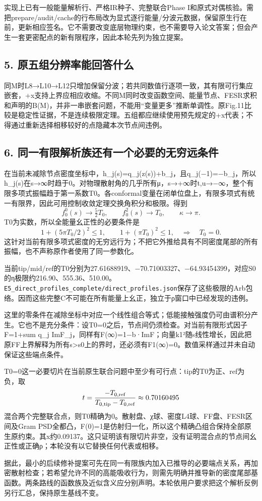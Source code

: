 \documentclass[
  11pt,
  a4paper,
]{article}
\begin{document}
实现上已有一般能量解析行、严格IR种子、完整联合Phase
I和原式对偶核验。需把prepare/audit/cache的行布局改为显式逐行能量/分波元数据，保留原生行在前，更新相应签名。它不需要改变底层物理约束，也不需要导入论文答案；但会产生一套更密配点的新有限程序，因此本轮先列为独立提案。

\subsection{5.
原五组分辨率能回答什么}\label{ux539fux4e94ux7ec4ux5206ux8fa8ux7387ux80fdux56deux7b54ux4ec0ux4e48}

同M时L8→L10→L12只增加保留分波；若共同数值行逐项一致，其有限可行集应嵌套，+x支持上界应相应收缩。不同M同时改变函数空间、能量节点、FESR求积和声明的B(M)，并非一串嵌套问题，不能用``变量更多''推断单调性。原Fig.11比较是稳定性证据，不是连续极限定理。五组都应继续使用预先规定的+x代表；不得通过重新选择相移较好的点隐藏本次节点间违例。

\subsection{6.
同一有限解析族还有一个必要的无穷远条件}\label{ux540cux4e00ux6709ux9650ux89e3ux6790ux65cfux8fd8ux6709ux4e00ux4e2aux5fc5ux8981ux7684ux65e0ux7a77ux8fdcux6761ux4ef6}

在当前未减除节点密度坐标中，h\_j(s)=q\_j(z(s))+b\_j，且q\_j(−1)=−b\_j，所以h\_j(s)在s→∞时趋于0。对物理散射角的几乎所有μ，s→+∞时t,u→−∞，整个有限多项式振幅趋于第一系数T0。各conformal变量在闭单位盘上，有限多项式有统一有限界，因此可用控制收敛定理交换角积分和极限。得到
\[
f_0^0(s)\longrightarrow\tfrac52T_0,
\qquad f_0^2(s)\longrightarrow T_0,
\qquad \kappa\longrightarrow\pi.
\] T0为实数，所以全能量幺正性的必要条件是 \[
1+(5\pi T_0/2)^2\le1,\qquad 1+(\pi T_0)^2\le1,
\quad\Longrightarrow\quad T_0=0.
\]
这针对当前有限多项式密度的无穷远行为；不把它外推给具有不同密度尾部的所有振幅，也不声称原作者使用了同一参数化。

当前tip/mid/ref的T0分别为27.61688919、−70.71003327、−64.93454399，对应S0的η极限约216.90、555.36、510.00。\texttt{E5\_direct\_profiles\_complete/direct\_profiles.json}保存了这些极限的Arb包络。因而这些完整C不可能在所有能量上幺正，独立于ρ窗口中已经发现的违例。

这里的零条件在减除坐标中对应一个线性组合等式；低能接触强度仍可由谱积分产生。它也不是充分条件：设T0=0之后，节点间仍须检查。对当前有限形式因子F=1+sum
q\_j
ImF\_j，同样有F(∞)=1−b·ImF；向量k1²随s线性增长，因此把原FF上界解释为所有s\textgreater s0上的界时，还必须有F1(∞)=0。数值采样通过并未自动保证这些端点条件。

T0=0这一必要切片在当前原生联合问题中至少有可行点：tip的T0为正、ref为负，取
\[
t={-T_{0,\mathrm{ref}}\over T_{0,\mathrm{tip}}-T_{0,\mathrm{ref}}}\approx0.70160495
\]
混合两个完整联合点，则T0精确为0。散射盘、χ球、密度L4球、FF盘、FESR区间及Gram
PSD全都凸，F(0)=1是仿射归一化，所以这个精确凸组合保持全部原生原约束。其x约0.09137。这只证明该有限切片非空，没有证明混合点的节点间幺正性或正确ρ；本轮没有以它替换任何代表或相移。

据此，最小的后续修补提案可先在同一有限族内加入已推导的必要端点关系，再加密散射检查；若希望允许不同的高能吸收行为，则需先明确并推导新的密度尾部基函数。两条路线的函数族及近似含义应分别声明。本轮依用户要求把这个解析反例另行汇总，保持原生基线不变。
\end{document}
